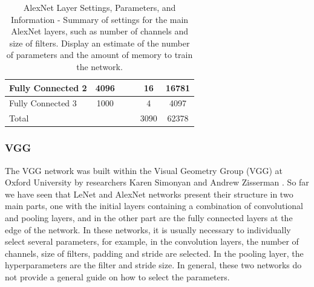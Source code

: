\begin{center}
\begin{table}[]
\begin{tabular}{|l|c|c|c|c|c|}
Fully Connected 2 & 4096                                                           &                                                               &                                                               & 16                                                             & 16781               \\ \hline
Fully Connected 3 & 1000                                                           &                                                               &                                                               & 4                                                              & 4097                \\ \hline
Total             &                                                                &                                                               &                                                               & 3090                                                           & 62378               \\ \hline
\end{tabular}
\caption{AlexNet Layer Settings, Parameters, and Information - Summary of settings for the main AlexNet layers, such as number of channels and size of filters. Display an estimate of the number of parameters and the amount of memory to train the network.}

\label{table:tablealexnet}
\end{table}
\end{center}

\subsubsection{VGG} \label{vgg}

The VGG network was built within the Visual Geometry Group (VGG) at Oxford University by researchers Karen Simonyan and Andrew Zisserman \cite{zhang2020dive}. So far we have seen that LeNet and AlexNet networks present their structure in two main parts, one with the initial layers containing a combination of convolutional and pooling layers, and in the other part are the fully connected layers at the edge of the network. In these networks, it is usually necessary to individually select several parameters, for example, in the convolution layers, the number of channels, size of filters, padding and stride are selected. In the pooling layer, the hyperparameters are the filter and stride size. In general, these two networks do not provide a general guide on how to select the parameters.

